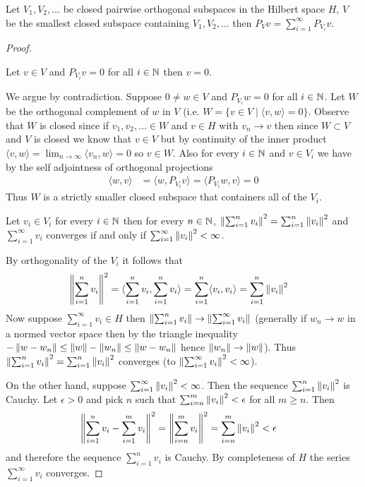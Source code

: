 \begin{lem}Let $V_1, V_2, \dotsc$ be closed pairwise orthogonal subspaces in the Hilbert space $H$, $V$ be the smallest closed subspace containing $V_1, V_2, \dotsc$ then $P_V v = \sum_{i=1}^\infty P_{V_i} v$.  
\end{lem}
\begin{proof}
\begin{clm}Let $v \in V$ and $P_{V_i} v = 0$ for all $i \in \mathbb{N}$ then $v=0$.
\end{clm}
We argue by contradiction.  Suppose $0 \neq w \in V$ and $P_{V_i} w = 0$ for all $i \in \mathbb{N}$.  Let $W$ be the orthogonal complement of $w$ in $V$ (i.e. $W = \lbrace v \in V \mid \langle v,w \rangle=0 \rbrace$.  Observe that $W$ is closed since if $v_1, v_2, \dotsc \in W$ and $v \in H$ with $v_n \to v$ then since $W \subset V$ and $V$ is closed we know that $v \in V$ but by continuity of the inner product $\langle v,w \rangle = \lim_{n \to \infty} \langle v_n, w \rangle = 0$ so $v \in W$.  Also for every $i \in \mathbb{N}$ and $v \in V_i$ we have by the self adjointness of orthogonal projections 
\begin{align*}
\langle w, v \rangle &= \langle w, P_{V_i} v \rangle = \langle P_{V_i} w, v \rangle = 0
\end{align*}
Thus $W$ is a strictly smaller closed subspace that containers all of the $V_i$.

\begin{clm}\label{hilbert:SumOfOrthogonalSubspaces} Let $v_i \in V_i$ for every $i \in \mathbb{N}$ then for every $n \in \mathbb{N}$, $\left \lVert \sum_{i=1}^n v_i \right \rVert^2 =\sum_{i=1}^n \left \lVert  v_i \right \rVert^2$ and $\sum_{i=1}^\infty v_i$ converges if and only if $\sum_{i=1}^\infty \left \lVert v_i \right \rVert^2 < \infty$.
\end{clm}
By orthogonality of the $V_i$ it follows that 
\begin{align*}
\left \lVert \sum_{i=1}^n v_i \right \rVert^2 &= \langle \sum_{i=1}^n v_i, \sum_{i=1}^n v_i \rangle = \sum_{i=1}^n \langle v_i , v_i \rangle = \sum_{i=1}^n \left \lVert  v_i \right \rVert^2
\end{align*}
Now suppose $\sum_{i=1}^\infty v_i \in H$ then $\left \lVert \sum_{i=1}^n v_i \right \rVert \to \left \lVert \sum_{i=1}^\infty v_i \right \rVert$  (generally if $w_n \to w$ in a normed vector space then by the triangle inequality $-\left \lVert w - w_n \right \rVert \leq \left \lVert w \right \rVert - \left \lVert w_n \right \rVert \leq \left \lVert w - w_n \right \rVert$ hence $\left \lVert w_n \right \rVert \to \left \lVert w \right \rVert$).  Thus $\left \lVert \sum_{i=1}^n v_i \right \rVert^2 = \sum_{i=1}^n\left \lVert  v_i \right \rVert^2$ converges (to $\left \lVert \sum_{i=1}^\infty v_i \right \rVert^2 < \infty$).  

On the other hand, suppose $\sum_{i=1}^\infty \left \lVert v_i \right \rVert^2 < \infty$.  Then the sequence $\sum_{i=1}^n \left \lVert v_i \right \rVert^2$ is Cauchy.  Let $\epsilon > 0$ and pick $n$ such that $\sum_{i=n}^m \left \lVert v_i \right \rVert^2 < \epsilon$ for all $m \geq n$.  Then 
\begin{align*}
\left \lVert \sum_{i=1}^n v_i - \sum_{i=1}^m v_i \right \rVert^2 &= \left \lVert \sum_{i=n}^m v_i \right \rVert^2 = \sum_{i=n}^m \left \lVert  v_i \right \rVert^2 < \epsilon
\end{align*}
and therefore the sequence $\sum_{i=1}^n v_i$ is Cauchy.  By completeness of $H$ the series $\sum_{i=1}^\infty v_i$ converges.


\end{proof}

